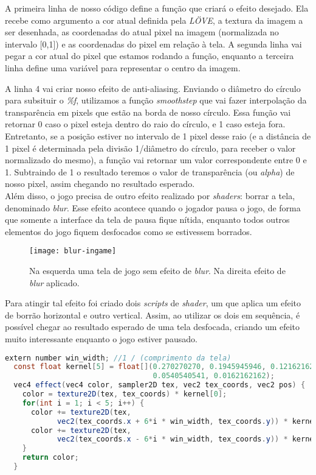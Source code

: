A primeira linha de nosso código define a função que criará o efeito desejado. Ela recebe como argumento a cor atual definida pela \textit{LÖVE}, a textura da imagem a ser desenhada, as coordenadas do atual pixel na imagem (normalizada no intervalo [0,1]) e as coordenadas do pixel em relação à tela. A segunda linha vai pegar a cor atual do pixel que estamos rodando a função,
enquanto a terceira linha define uma variável para representar o centro da imagem.

A linha 4 vai criar nosso efeito de anti-aliasing. Enviando o diâmetro do círculo para subsituir o \textit{\%f}, utilizamos a função \textit{smoothstep} que vai fazer interpolação da transparência em pixels que estão na borda de nosso círculo. Essa função vai retornar 0 caso o pixel esteja dentro do raio do círculo, e 1 caso esteja fora. Entretanto, se a posição estiver no intervalo de 1 pixel desse raio (e a distância de 1 pixel é determinada pela divisão 1/diâmetro do círculo, para receber o valor normalizado do mesmo), a função vai retornar um valor correspondente entre 0 e 1. Subtraindo de 1 o resultado teremos o valor de transparência (ou \textit{alpha}) de nosso pixel, assim chegando no resultado esperado.\\


Além disso, o jogo precisa de outro efeito realizado por \textit{shaders}: borrar a tela, denominado \textit{blur}. Esse efeito acontece quando o jogador pausa o jogo, de forma que somente a interface da tela de pausa fique nítida, enquanto todos outros elementos do jogo fiquem desfocados como se estivessem borrados.

\begin{figure}[h]
\texttt{[image: blur-ingame]}
\centering
\caption{Na esquerda uma tela de jogo sem efeito de \textit{blur}. Na direita efeito de \textit{blur} aplicado.}
\end{figure}

Para atingir tal efeito foi criado dois \textit{scripts} de \textit{shader}, um que aplica um efeito de borrão horizontal e outro vertical. Assim, ao utilizar os dois em sequência, é possível chegar ao resultado esperado de uma tela desfocada, criando um efeito muito interessante enquanto o jogo estiver pausado.

\begin{lstlisting}[language=java]
  extern number win_width; //1 / (comprimento da tela)
  const float kernel[5] = float[](0.270270270, 0.1945945946, 0.1216216216,
                                  0.0540540541, 0.0162162162);
  vec4 effect(vec4 color, sampler2D tex, vec2 tex_coords, vec2 pos) {
    color = texture2D(tex, tex_coords) * kernel[0];
    for(int i = 1; i < 5; i++) {
      color += texture2D(tex,
            vec2(tex_coords.x + 6*i * win_width, tex_coords.y)) * kernel[i];
      color += texture2D(tex,
            vec2(tex_coords.x - 6*i * win_width, tex_coords.y)) * kernel[i];
    }
    return color;
  }
\end{lstlisting}

